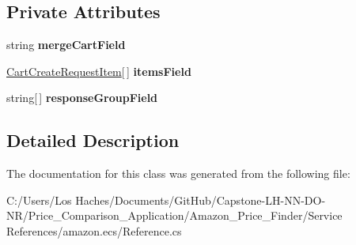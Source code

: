 \subsection*{Private Attributes}
\begin{DoxyCompactItemize}
\item 
\hypertarget{class_price___comparison_1_1amazon_1_1ecs_1_1_cart_create_request_a391856e7773a0b10c053bf9820221fd9}{string {\bfseries merge\-Cart\-Field}}\label{class_price___comparison_1_1amazon_1_1ecs_1_1_cart_create_request_a391856e7773a0b10c053bf9820221fd9}

\item 
\hypertarget{class_price___comparison_1_1amazon_1_1ecs_1_1_cart_create_request_a7647e71e3b9c41f21a54fd590eeab806}{\hyperlink{class_price___comparison_1_1amazon_1_1ecs_1_1_cart_create_request_item}{Cart\-Create\-Request\-Item}\mbox{[}$\,$\mbox{]} {\bfseries items\-Field}}\label{class_price___comparison_1_1amazon_1_1ecs_1_1_cart_create_request_a7647e71e3b9c41f21a54fd590eeab806}

\item 
\hypertarget{class_price___comparison_1_1amazon_1_1ecs_1_1_cart_create_request_ac22c827b2bdce238c89e9416747ff74f}{string\mbox{[}$\,$\mbox{]} {\bfseries response\-Group\-Field}}\label{class_price___comparison_1_1amazon_1_1ecs_1_1_cart_create_request_ac22c827b2bdce238c89e9416747ff74f}

\end{DoxyCompactItemize}


\subsection{Detailed Description}


The documentation for this class was generated from the following file\-:\begin{DoxyCompactItemize}
\item 
C\-:/\-Users/\-Los Haches/\-Documents/\-Git\-Hub/\-Capstone-\/\-L\-H-\/\-N\-N-\/\-D\-O-\/\-N\-R/\-Price\-\_\-\-Comparison\-\_\-\-Application/\-Amazon\-\_\-\-Price\-\_\-\-Finder/\-Service References/amazon.\-ecs/Reference.\-cs\end{DoxyCompactItemize}
